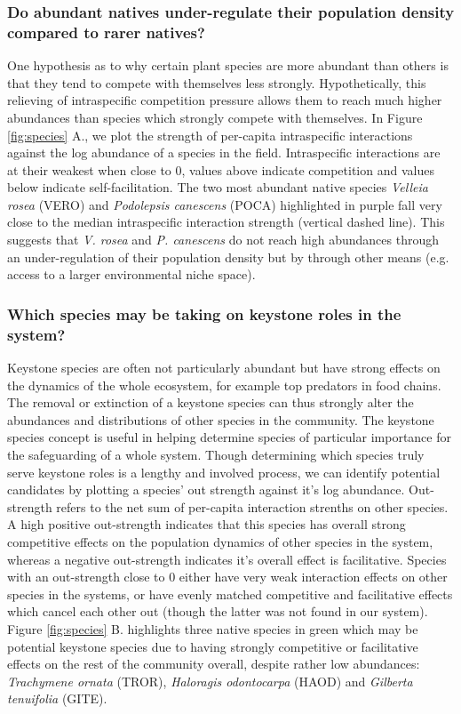 \documentclass[a4,12pt]{article}
\begin{document}
    \subsubsection*{Do abundant natives under-regulate their population density compared to rarer natives?}
    One hypothesis as to why certain plant species are more abundant than others is that they tend to compete with themselves less strongly. Hypothetically, this relieving of intraspecific competition pressure allows them to reach much higher abundances than species which strongly compete with themselves. In Figure \ref{fig:species} A., we plot the strength of per-capita intraspecific interactions against the log abundance of a species in the field. Intraspecific interactions are at their weakest when close to $0$, values above indicate competition and values below indicate self-facilitation. The two most abundant native species \textit{Velleia rosea} (VERO) and \textit{Podolepsis canescens} (POCA) highlighted in purple fall very close to the median intraspecific interaction strength (vertical dashed line). This suggests that \textit{V. rosea} and \textit{P. canescens} do not reach high abundances through an under-regulation of their population density but by through other means (e.g. access to a larger environmental niche space). 


    \subsubsection*{Which species may be taking on keystone roles in the system?}
    Keystone species are often not particularly abundant but have strong effects on the dynamics of the whole ecosystem, for example top predators in food chains. The removal or extinction of a keystone species can thus strongly alter the abundances and distributions of other species in the community. The keystone species concept is useful in helping determine species of particular importance for the safeguarding of a whole system. Though determining which species truly serve keystone roles is a lengthy and involved process, we can identify potential candidates by plotting a species' out strength against it's log abundance. Out-strength refers to the net sum of per-capita interaction strenths on other species. A high positive out-strength indicates that this species has overall strong competitive effects on the population dynamics of other species in the system, whereas a negative out-strength indicates it's overall effect is facilitative. Species with an out-strength close to 0 either have very weak interaction effects on other species in the systems, or have evenly matched competitive and facilitative effects which cancel each other out (though the latter was not found in our system). Figure \ref{fig:species} B. highlights three native species in green which may be potential keystone species due to having strongly competitive or facilitative effects on the rest of the community overall, despite rather low abundances: \textit{Trachymene ornata} (TROR), \textit{Haloragis odontocarpa} (HAOD) and \textit{Gilberta tenuifolia} (GITE). 
\end{document}
